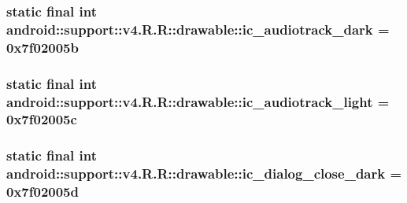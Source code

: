 \hypertarget{classandroid_1_1support_1_1v4_1_1_r_1_1drawable_87a0babdcb97b758bc8d9b0edb8fdd4e}{
\subsubsection[{ic\_\-audiotrack\_\-dark}]{\setlength{\rightskip}{0pt plus 5cm}static final int android::support::v4.R.R::drawable::ic\_\-audiotrack\_\-dark = 0x7f02005b}}
\label{classandroid_1_1support_1_1v4_1_1_r_1_1drawable_87a0babdcb97b758bc8d9b0edb8fdd4e}


\hypertarget{classandroid_1_1support_1_1v4_1_1_r_1_1drawable_75b449ca63b6df6ca7f0b86245a125b3}{
\subsubsection[{ic\_\-audiotrack\_\-light}]{\setlength{\rightskip}{0pt plus 5cm}static final int android::support::v4.R.R::drawable::ic\_\-audiotrack\_\-light = 0x7f02005c}}
\label{classandroid_1_1support_1_1v4_1_1_r_1_1drawable_75b449ca63b6df6ca7f0b86245a125b3}


\hypertarget{classandroid_1_1support_1_1v4_1_1_r_1_1drawable_81d1213d598a5eb9aebcddb2cea69454}{
\subsubsection[{ic\_\-dialog\_\-close\_\-dark}]{\setlength{\rightskip}{0pt plus 5cm}static final int android::support::v4.R.R::drawable::ic\_\-dialog\_\-close\_\-dark = 0x7f02005d}}
\label{classandroid_1_1support_1_1v4_1_1_r_1_1drawable_81d1213d598a5eb9aebcddb2cea69454}


